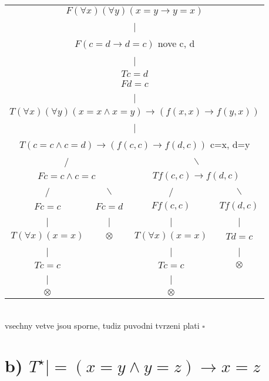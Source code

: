\documentclass[a4paper]{article}
\begin{document}
\begin{tabular}{ c c c c }
    \multicolumn{4}{c}{$F(\forall x)(\forall y)(x=y\rightarrow y=x)$} \\
    \multicolumn{4}{c}{|} \\
    \multicolumn{4}{c}{$F(c=d\rightarrow d=c)$ nove c, d} \\
    \multicolumn{4}{c}{|} \\
    \multicolumn{4}{c}{$T c=d$}\\
    \multicolumn{4}{c}{$F d=c$}\\
    \multicolumn{4}{c}{|} \\
    \multicolumn{4}{c}{$T(\forall x)(\forall y)(x=x \wedge x=y)\rightarrow(f(x,x)\rightarrow f(y,x))$}\\
    \multicolumn{4}{c}{|} \\
    \multicolumn{4}{c}{$T(c=c \wedge c=d) \rightarrow (f(c,c) \rightarrow f(d,c))$ c=x, d=y}\\ 
    \multicolumn{2}{c}{/} & \multicolumn{2}{c}{$\backslash$} \\
    \multicolumn{2}{c}{$F c=c \wedge c=c$} & \multicolumn{2}{c}{$T f(c,c) \rightarrow f(d,c)$} \\
    / & $\backslash$ & / & $\backslash$ \\
    $F c=c$ & $F c=d$ & $Ff(c,c)$ & $Tf(d,c)$  \\ 
    | & | & | & | \\
    $T(\forall x)(x=x)$ & $\otimes$ &  $T(\forall x)(x=x)$ & $T d=c$ \\  
    | &  & | & | \\
    $T c=c$ &  & $T c=c$ & $\otimes$ \\
    | &  & | &  \\
    $\otimes$ &  & $\otimes$ &     
\end{tabular}
\\
vsechny vetve jsou sporne, tudiz puvodni tvrzeni plati $\square$



\section*{b)  $T^\star |= (x = y \wedge y = z) \rightarrow x = z$}
\end{document}
